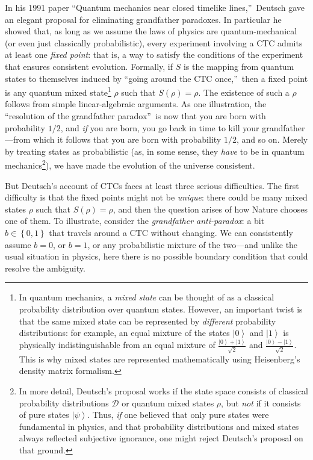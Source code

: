 \documentclass[12pt,onecolumn]{article}%
\begin{document}
In his 1991 paper \textquotedblleft Quantum mechanics near closed timelike
lines,\textquotedblright\  Deutsch \cite{deutsch:ctc} gave an elegant proposal
for eliminating grandfather paradoxes. In particular he showed that, as long
as we assume the laws of physics are quantum-mechanical (or even just
classically probabilistic), every experiment involving a CTC admits at least
one \textit{fixed point}: that is, a way to satisfy the conditions of the
experiment that ensures consistent evolution. Formally, if $S$ is the
mapping from quantum states to themselves induced by \textquotedblleft going
around the CTC once,\textquotedblright\  then a fixed point is any quantum
mixed state\footnote{In quantum mechanics, a \textit{mixed state} can be
thought of as a classical probability distribution over quantum states.
 However, an important twist is that the same mixed state can be represented
by \textit{different} probability distributions: for example, an equal mixture
of the states $\left\vert 0\right\rangle $ and $\left\vert 1\right\rangle
$ is physically indistinguishable from an equal mixture of $\frac{\left\vert
0\right\rangle +\left\vert 1\right\rangle }{\sqrt{2}}$ and $\frac{\left\vert
0\right\rangle -\left\vert 1\right\rangle }{\sqrt{2}}$. This is why mixed
states are represented mathematically using Heisenberg's density matrix
formalism.} $\rho$ such that $S(  \rho)  =\rho$. The existence
of such a $\rho$ follows from simple linear-algebraic arguments. As one
illustration, the \textquotedblleft resolution of the grandfather
paradox\textquotedblright\  is now that you are born with probability $1/2$,
and \textit{if} you are born, you go back in time to kill your
grandfather---from which it follows that you are born with probability $1/2$,
and so on. Merely by treating states as probabilistic (as, in some sense,
they \textit{have} to be in quantum mechanics\footnote{In more detail,
Deutsch's proposal works if the state space consists of classical probability
distributions $\mathcal{D}$ or quantum mixed states $\rho$, but \textit{not}
if it consists of pure states $\left\vert \psi\right\rangle $. Thus,
\textit{if} one believed that only pure states were fundamental in physics,
and that probability distributions and mixed states always reflected
subjective ignorance, one might reject Deutsch's proposal on that ground.}),
we have made the evolution of the universe consistent.

But Deutsch's account of CTCs faces at least three serious difficulties. The
first difficulty is that the fixed points might not be \textit{unique}: there
could be many mixed states $\rho$ such that $S(  \rho)  =\rho$,
and then the question arises of how Nature chooses one of them. To
illustrate, consider the \textit{grandfather anti-paradox}: a bit
$b\in\left\{  0,1\right\}  $ that travels around a CTC without changing. We
can consistently assume $b=0$, or $b=1$, or any probabilistic mixture of the
two---and unlike the usual situation in physics, here there is no possible
boundary condition that could resolve the ambiguity.
\end{document}
